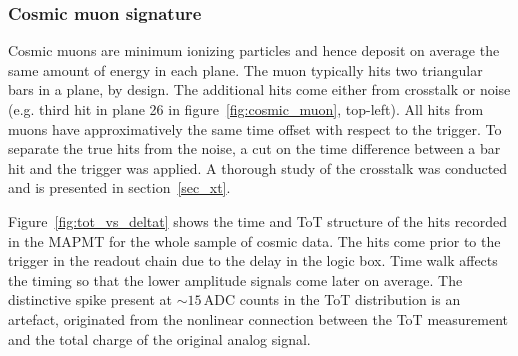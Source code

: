 \documentclass[a4paper,11pt]{article}
\begin{document}
\subsubsection{Cosmic muon signature}\label{sec:cosmic_sig}
Cosmic muons are minimum ionizing particles and hence deposit on average the same amount of energy in each plane. The muon typically hits two triangular
bars in a plane, by design. The additional hits come either from crosstalk or noise (e.g. third hit in plane 26 in figure~\ref{fig:cosmic_muon},
top-left). All hits from muons have approximatively the same time offset with respect to the trigger. To separate the true hits from the noise, a cut on
the time difference between a bar hit and the trigger was applied. A thorough study of the crosstalk was conducted and is presented in section~\ref{sec_xt}.
 
Figure~\ref{fig:tot_vs_deltat} shows the time and ToT structure of the hits recorded in the MAPMT for the whole sample of cosmic data. The hits
come prior to the trigger in the readout chain due to the delay in the logic box. Time walk affects the timing so that the lower amplitude signals come
later on average. The distinctive spike present at $\sim15$\,ADC counts in the ToT distribution is an artefact, originated from the nonlinear connection
between the ToT measurement and the total charge of the original analog signal.
\end{document}
